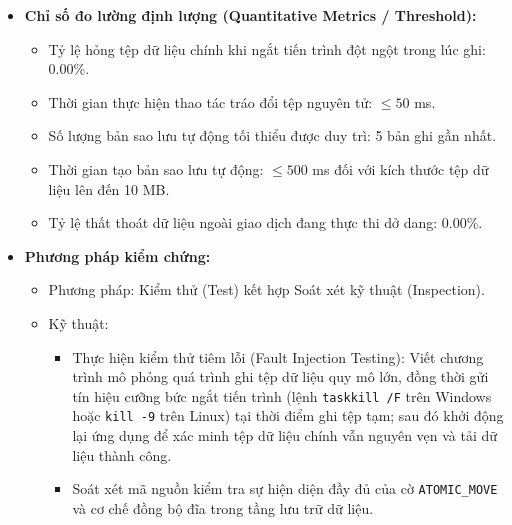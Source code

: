 \documentclass[11pt,a4paper]{article}
\providecommand{\tightlist}{
  \setlength{\itemsep}{0pt}\setlength{\parskip}{0pt}}
\begin{document}
\begin{itemize}
\begin{itemize}
    \begin{itemize}
    \tightlist
    \item
      Trước khi thực hiện các thao tác có nguy cơ ghi đè lớn như phục
      hồi dữ liệu từ tệp nhập ngoài (\texttt{UC10}) hoặc thiết lập lại
      hệ thống.
    \item
      Tự động duy trì tối thiểu 5 bản sao lưu cục bộ gần nhất tại thư
      mục lưu trữ sao lưu được cô lập, cho phép người dùng quay lui về
      trạng thái an toàn trước đó khi cần thiết.
    \end{itemize}
  \item
    Xử lý ngoại lệ I/O: Mọi thao tác đọc ghi hệ thống tệp bắt buộc phải
    được bọc trong các khối xử lý ngoại lệ chặt chẽ
    (\texttt{IOException}, \texttt{SecurityException}). Trong trường hợp
    ổ đĩa bị đầy hoặc thư mục bị khóa quyền ghi, hệ thống phải giữ
    nguyên trạng tệp dữ liệu gốc và thông báo lỗi rõ ràng tới người
    dùng.
  \end{itemize}
\item
  \textbf{Chỉ số đo lường định lượng (Quantitative Metrics /
  Threshold):}

  \begin{itemize}
  \tightlist
  \item
    Tỷ lệ hỏng tệp dữ liệu chính khi ngắt tiến trình đột ngột trong lúc
    ghi: 0.00\%.
  \item
    Thời gian thực hiện thao tác tráo đổi tệp nguyên tử: \(\le 50\) ms.
  \item
    Số lượng bản sao lưu tự động tối thiểu được duy trì: 5 bản ghi gần
    nhất.
  \item
    Thời gian tạo bản sao lưu tự động: \(\le 500\) ms đối với kích thước
    tệp dữ liệu lên đến 10 MB.
  \item
    Tỷ lệ thất thoát dữ liệu ngoài giao dịch đang thực thi dở dang:
    0.00\%.
  \end{itemize}
\item
  \textbf{Phương pháp kiểm chứng:}

  \begin{itemize}
  \tightlist
  \item
    Phương pháp: Kiểm thử (Test) kết hợp Soát xét kỹ thuật (Inspection).
  \item
    Kỹ thuật:

    \begin{itemize}
    \tightlist
    \item
      Thực hiện kiểm thử tiêm lỗi (Fault Injection Testing): Viết chương
      trình mô phỏng quá trình ghi tệp dữ liệu quy mô lớn, đồng thời gửi
      tín hiệu cưỡng bức ngắt tiến trình (lệnh \texttt{taskkill\ /F}
      trên Windows hoặc \texttt{kill\ -9} trên Linux) tại thời điểm ghi
      tệp tạm; sau đó khởi động lại ứng dụng để xác minh tệp dữ liệu
      chính vẫn nguyên vẹn và tải dữ liệu thành công.
    \item
      Soát xét mã nguồn kiểm tra sự hiện diện đầy đủ của cờ
      \texttt{ATOMIC\_MOVE} và cơ chế đồng bộ đĩa trong tầng lưu trữ dữ
      liệu.
    \end{itemize}
  \end{itemize}
\end{itemize}
\end{document}
